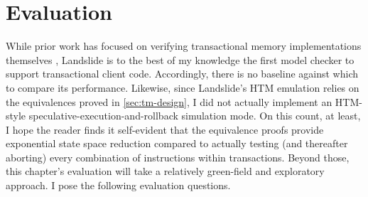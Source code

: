 

\section{Evaluation}
\label{sec:tm-eval}

While prior work has focused on verifying transactional memory implementations themselves
\cite{specifying-verifying-tm,tm-correctness,tm-completeness,mc-tm-with-spin},
Landslide is to the best of my knowledge the first model checker to support transactional client code.
Accordingly, there is no baseline against which to compare its performance.
Likewise, since Landslide's HTM emulation relies on the equivalences proved in \cref{sec:tm-design},
I did not actually implement an HTM-style speculative-execution-and-rollback simulation mode.
On this count, at least,
I hope the reader finds it self-evident that
the equivalence proofs provide exponential state space reduction
compared to actually testing (and thereafter aborting) every combination of instructions within transactions.
Beyond those, this chapter's evaluation will take a relatively green-field and exploratory approach.
I pose the following evaluation questions.


